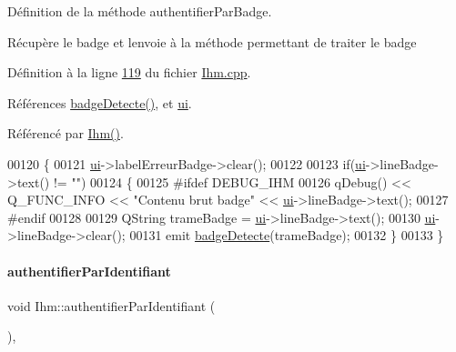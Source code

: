 Définition de la méthode authentifier\+Par\+Badge. 

Récupère le badge et l\textquotesingle{}envoie à la méthode permettant de traiter le badge 

Définition à la ligne \hyperlink{_ihm_8cpp_source_l00119}{119} du fichier \hyperlink{_ihm_8cpp_source}{Ihm.\+cpp}.



Références \hyperlink{class_ihm_a15daf0d4cd7c9afd6c97788e54328133}{badge\+Detecte()}, et \hyperlink{_ihm_8h_source_l00099}{ui}.



Référencé par \hyperlink{_ihm_8cpp_source_l00029}{Ihm()}.


\begin{DoxyCode}
00120 \{
00121     \hyperlink{class_ihm_a0ac5f47856566ceeeca1720109bf70ea}{ui}->labelErreurBadge->clear();
00122 
00123     \textcolor{keywordflow}{if}(\hyperlink{class_ihm_a0ac5f47856566ceeeca1720109bf70ea}{ui}->lineBadge->text() != \textcolor{stringliteral}{""})
00124     \{
00125 \textcolor{preprocessor}{        #ifdef DEBUG\_IHM}
00126             qDebug() << Q\_FUNC\_INFO << \textcolor{stringliteral}{"Contenu brut badge"} << \hyperlink{class_ihm_a0ac5f47856566ceeeca1720109bf70ea}{ui}->lineBadge->text();
00127 \textcolor{preprocessor}{        #endif}
00128 
00129         QString trameBadge = \hyperlink{class_ihm_a0ac5f47856566ceeeca1720109bf70ea}{ui}->lineBadge->text();
00130         \hyperlink{class_ihm_a0ac5f47856566ceeeca1720109bf70ea}{ui}->lineBadge->clear();
00131         emit \hyperlink{class_ihm_a15daf0d4cd7c9afd6c97788e54328133}{badgeDetecte}(trameBadge);
00132     \}
00133 \}
\end{DoxyCode}
\mbox{\label{class_ihm_afac914d96f4070dd7fd9e53d4b5989c1}} 
\paragraph{\texorpdfstring{authentifier\+Par\+Identifiant}{authentifierParIdentifiant}}
{\footnotesize\ttfamily void Ihm\+::authentifier\+Par\+Identifiant (\begin{DoxyParamCaption}{ }\end{DoxyParamCaption})\hspace{0.3cm}{\ttfamily [private]}, {\ttfamily [slot]}}



